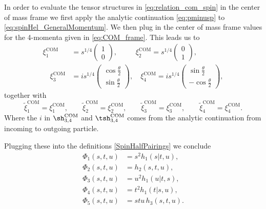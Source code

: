 In order to evaluate the tensor structures in \eqref{eq:relation_com_spin} in the center of mass frame we first apply the analytic continuation \eqref{eq:pminusp} to \eqref{eq:spinHel_GeneralMomentum}. We then plug in the center of mass frame values for the 4-momenta given in \eqref{eq:COM_frame}.  This leads us to
\begin{align}
	\xi_1^\text{COM} &= s^{1/4} \begin{pmatrix}1\\0 \end{pmatrix},
	\qquad\;\; 
	\xi_2^\text{COM} = s^{1/4} \begin{pmatrix}0\\1 \end{pmatrix}, \\
	\quad \xi_3^\text{COM} &= i s^{1/4} \begin{pmatrix}\cos\frac{\theta}{2}\\ \sin\frac{\theta}{2} \end{pmatrix},
	\quad \xi_4^\text{COM} = i s^{1/4} \begin{pmatrix}\sin\frac{\theta}{2}\\ -\cos\frac{\theta}{2} \end{pmatrix},
	\label{SpinHelCMin}
\end{align}
together with
\begin{equation}
	\tilde{\xi}_{1} ^\text{COM}= \xi_{1}^\text{COM},\qquad
	\tilde{\xi}_{2}^\text{COM} = \xi_{2}^\text{COM},\qquad
	\tilde{\xi}_{3}^\text{COM} = \xi_{3}^\text{COM},\qquad
	\tilde{\xi}_{4}^\text{COM} = \xi_{4}^\text{COM}.
\end{equation}
Where the $i$ in $\sh^{\text{COM}}_{3,4}$ and $\tsh^{\text{COM}}_{3,4}$ comes from the analytic continuation from incoming to outgoing particle. 


Plugging these into the definitions \eqref{SpinHalfPairings} we conclude
\begin{equation}
	\label{eq:Phi_h_relation}
	\begin{aligned}
			\Phi_1(s,t,u)&= s^2 h_1(s|t,u), \\
			\Phi_2(s,t,u)&= h_2(s,t,u),\\
			\Phi_3(s,t,u)&= u^2 h_1(u|t,s),\\
			\Phi_4(s,t,u)&= t^2 h_1(t|s,u),\\
			\Phi_5(s,t,u)&= stu\, h_3(s,t,u).
	\end{aligned}
\end{equation}


